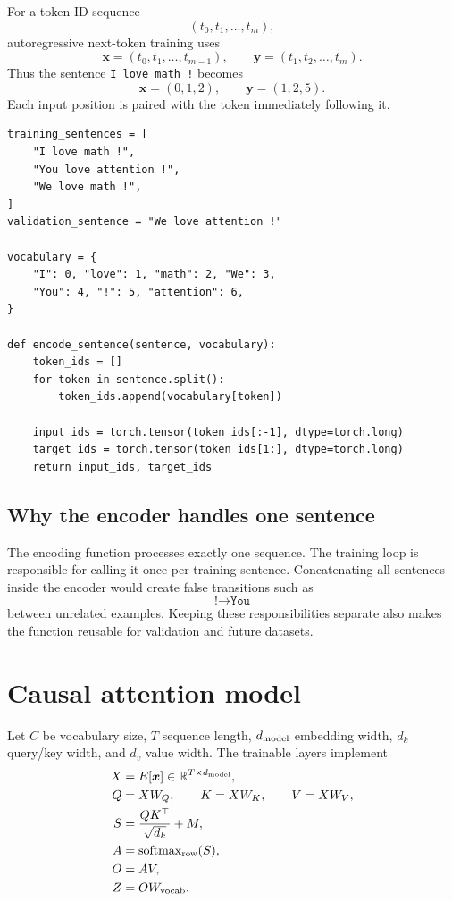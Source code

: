 \documentclass[11pt]{article}
\newcommand{\R}{\mathbb{R}}
\newcommand{\softmax}{\operatorname{softmax}}
\begin{document}
For a token-ID sequence
\[
(t_0,t_1,\ldots,t_m),
\]
autoregressive next-token training uses
\[
\bm{x}=(t_0,t_1,\ldots,t_{m-1}),\qquad
\bm{y}=(t_1,t_2,\ldots,t_m).
\]
Thus the sentence \texttt{I love math !} becomes
\[
\bm{x}=(0,1,2),\qquad \bm{y}=(1,2,5).
\]
Each input position is paired with the token immediately following it.

\begin{lstlisting}
training_sentences = [
    "I love math !",
    "You love attention !",
    "We love math !",
]
validation_sentence = "We love attention !"

vocabulary = {
    "I": 0, "love": 1, "math": 2, "We": 3,
    "You": 4, "!": 5, "attention": 6,
}

def encode_sentence(sentence, vocabulary):
    token_ids = []
    for token in sentence.split():
        token_ids.append(vocabulary[token])

    input_ids = torch.tensor(token_ids[:-1], dtype=torch.long)
    target_ids = torch.tensor(token_ids[1:], dtype=torch.long)
    return input_ids, target_ids
\end{lstlisting}

\subsection{Why the encoder handles one sentence}

The encoding function processes exactly one sequence. The training loop is responsible for calling it once
per training sentence. Concatenating all sentences inside the encoder would create false transitions such as
\[
\texttt{!}\longrightarrow\texttt{You}
\]
between unrelated examples. Keeping these responsibilities separate also makes the function reusable for
validation and future datasets.

\section{Causal attention model}

Let $C$ be vocabulary size, $T$ sequence length, $d_{\rm model}$ embedding width, $d_k$ query/key width,
and $d_v$ value width. The trainable layers implement
\begin{align}
X &= E[\bm{x}] \in \R^{T\times d_{\rm model}},\\
Q &= XW_Q,\qquad K=XW_K,\qquad V=XW_V,\\
S &= \frac{QK^\top}{\sqrt{d_k}}+M,\\
A &= \softmax_{\rm row}(S),\\
O &= AV,\\
Z &= OW_{\rm vocab}.
\end{align}
\end{document}

